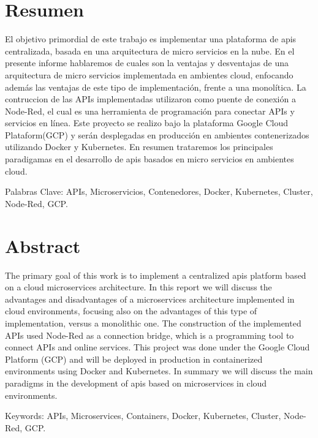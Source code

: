 \chapter*{Resumen} %

El objetivo primordial de este trabajo es implementar una plataforma  de apis centralizada, basada en una arquitectura de micro servicios en la nube. En el presente informe hablaremos de cuales son la  ventajas y desventajas de una arquitectura de micro servicios implementada en ambientes cloud, enfocando además las ventajas de este tipo de implementación, frente a una monolítica. La contruccion de las  APIs implementadas utilizaron como puente de conexión a Node-Red, el cual es una herramienta de programación para conectar APIs y servicios en línea. Este proyecto se realizo bajo la plataforma Google Cloud Plataform(GCP) y serán desplegadas en producción en ambientes contenerizados utilizando Docker y Kubernetes. En resumen trataremos los principales paradigamas en el desarrollo de apis basados en micro servicios en ambientes cloud. 

\hfill

Palabras Clave: APIs, Microservicios, Contenedores, Docker, Kubernetes, Cluster, Node-Red, GCP.

\clearpage

\chapter*{Abstract}

The primary goal of this work is to implement a centralized apis platform based on a cloud microservices architecture. In this report we will discuss the advantages and disadvantages of a microservices architecture implemented in cloud environments, focusing also on the advantages of this type of implementation, versus a monolithic one. The construction of the implemented APIs used Node-Red as a connection bridge, which is a programming tool to connect APIs and online services. This project was done under the Google Cloud Platform (GCP) and will be deployed in production in containerized environments using Docker and Kubernetes. In summary we will discuss the main paradigms in the development of apis based on microservices in cloud environments. 

\hfill

Keywords: APIs, Microservices, Containers, Docker, Kubernetes, Cluster, Node-Red, GCP.

